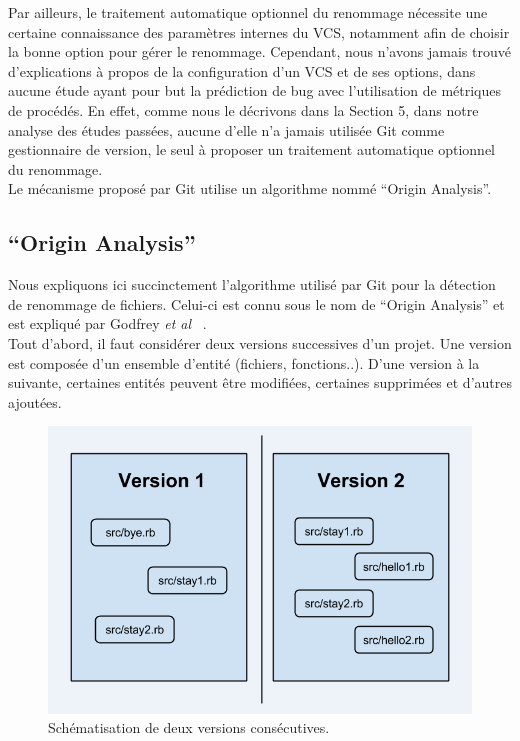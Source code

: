 Par ailleurs, le traitement automatique optionnel du renommage nécessite une certaine connaissance des paramètres internes du VCS, notamment afin de choisir la bonne option pour gérer le renommage. Cependant, nous n'avons jamais trouvé d'explications à propos de la configuration d'un VCS et de ses options, dans aucune étude ayant pour but la prédiction de bug avec l'utilisation de métriques de procédés. En effet, comme nous le décrivons dans la Section 5, dans notre analyse des études passées, aucune d'elle n'a jamais utilisée Git comme gestionnaire de version, le seul à proposer un traitement automatique optionnel du renommage.\\

Le mécanisme proposé par Git utilise un algorithme nommé ``Origin Analysis''.

\subsection{``Origin Analysis''}

Nous expliquons ici succinctement l'algorithme utilisé par Git pour la détection de renommage de fichiers. Celui-ci est connu sous le nom de ``Origin Analysis'' et est expliqué par Godfrey \emph{et al} ~\cite{tu_integrated_2002,godfrey_tracking_2002,godfrey_using_2005}.\\

Tout d'abord, il faut considérer deux versions successives d'un projet. Une version est composée d'un ensemble d'entité (fichiers, fonctions..). D'une version à la suivante, certaines entités peuvent être modifiées, certaines supprimées et d'autres ajoutées. 

\begin{figure}[h]
  \centering
  \includegraphics[scale=0.5]{data/figures/oa.png}
	\caption{Schématisation de deux versions consécutives.}
	\label{fig:oa}
\end{figure}

